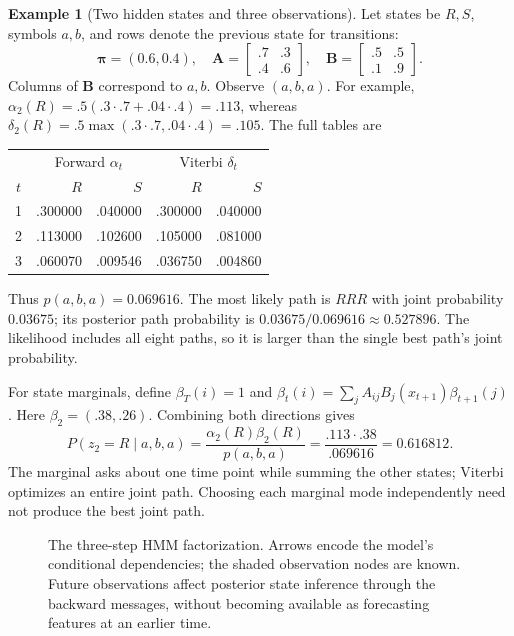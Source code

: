 \documentclass[11pt,twoside]{article}
\numberwithin{equation}{section}
\newcommand{\vect}[1]{\bm{#1}}
\newcommand{\mat}[1]{\bm{#1}}
\theoremstyle{plain}
\theoremstyle{definition}
\newtheorem{example}[theorem]{Example}
\theoremstyle{remark}
\begin{document}
\begin{example}[Two hidden states and three observations]
Let states be $R,S$, symbols $a,b$, and rows denote the previous state for transitions:
\[
\vect\pi=(0.6,0.4),\quad
\mat A=\begin{bmatrix}.7&.3\\.4&.6\end{bmatrix},\quad
\mat B=\begin{bmatrix}.5&.5\\.1&.9\end{bmatrix}.
\]
Columns of $\mat B$ correspond to $a,b$. Observe $(a,b,a)$. For example,
$\alpha_2(R)=.5(.3\cdot.7+.04\cdot.4)=.113$, whereas
$\delta_2(R)=.5\max(.3\cdot.7,.04\cdot.4)=.105$.
The full tables are
\begin{center}
\begin{tabular}{c|rr|rr}
&\multicolumn{2}{c|}{Forward $\alpha_t$}&\multicolumn{2}{c}{Viterbi $\delta_t$}\\
$t$&$R$&$S$&$R$&$S$\\\hline
1&.300000&.040000&.300000&.040000\\
2&.113000&.102600&.105000&.081000\\
3&.060070&.009546&.036750&.004860
\end{tabular}
\end{center}
Thus $p(a,b,a)=0.069616$. The most likely path is $RRR$ with joint probability $0.03675$; its posterior path probability is $0.03675/0.069616\approx0.527896$. The likelihood includes all eight paths, so it is larger than the single best path's joint probability.

For state marginals, define $\beta_T(i)=1$ and
$\beta_t(i)=\sum_j A_{ij}B_j(x_{t+1})\beta_{t+1}(j)$. Here $\beta_2=(.38,.26)$. Combining both directions gives
\[
P(z_2=R\mid a,b,a)=\frac{\alpha_2(R)\beta_2(R)}{p(a,b,a)}
=\frac{.113\cdot.38}{.069616}=0.616812.
\]
The marginal asks about one time point while summing the other states; Viterbi optimizes an entire joint path. Choosing each marginal mode independently need not produce the best joint path.
\end{example}

\begin{figure}[H]
\centering
{}
\caption{The three-step HMM factorization. Arrows encode the model's conditional dependencies; the shaded observation nodes are known. Future observations affect posterior state inference through the backward messages, without becoming available as forecasting features at an earlier time.}
\end{figure}
\end{document}
